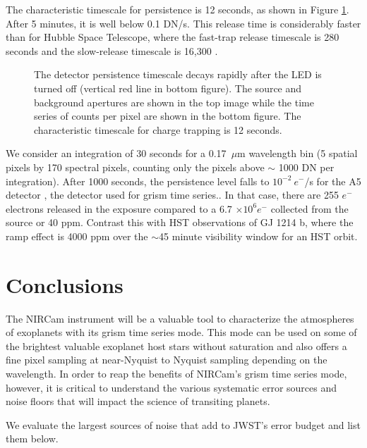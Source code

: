 \documentclass[]{aastex62}
\begin{document}
The characteristic timescale for persistence is 12 seconds, as shown in Figure \ref{fig:persistence}.
After 5 minutes, it is well below 0.1 DN/s.
This release time is considerably faster than for Hubble Space Telescope, where the fast-trap release timescale is 280 seconds and the slow-release timescale is 16,300 \citep{zhou2017chargeTrap}.

\begin{figure}
{}
{}
\caption{The detector persistence timescale decays rapidly after the LED is turned off (vertical red line in bottom figure).
The source and background apertures are shown in the top image while the time series of counts per pixel are shown in the bottom figure.
The characteristic timescale for charge trapping is 12 seconds.}\label{fig:persistence}
\end{figure}

We consider an  integration of 30 seconds for a 0.17~$\mu$m wavelength bin (5 spatial pixels by 170 spectral pixels, counting only the pixels above $\sim$ 1000 DN per integration).
After 1000 seconds, the persistence level falls to $10^{-2}~e^-$/s for the A5 detector \citep{leisenring2016persistence}, the detector used for grism time series..
In that case, there are 255 $e^-$ electrons released in the exposure compared to a 6.7 $\times 10^6 e^-$ collected from the source or 40 ppm.
Contrast this with HST observations of GJ 1214 b, where the ramp effect is 4000 ppm \citep{berta2012flat_gj1214} over the $\sim$45 minute visibility window for an HST orbit.

\section{Conclusions}\label{sec:Conclusion}
The NIRCam instrument will be a valuable tool to characterize the atmospheres of exoplanets with its grism time series mode.
This mode can be used on some of the brightest valuable exoplanet host stars without saturation and also offers a fine pixel sampling at near-Nyquist to Nyquist sampling depending on the wavelength.
In order to reap the benefits of NIRCam's grism time series mode, however, it is critical to understand the various systematic error sources and noise floors that will impact the science of transiting planets.

We evaluate the largest sources of noise that add to JWST's error budget and list them below.
\end{document}
